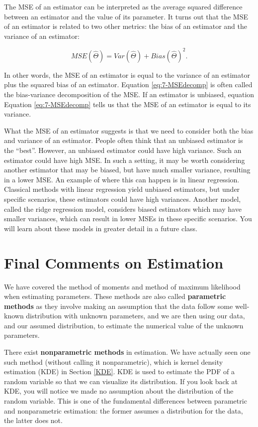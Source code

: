 \documentclass[
]{book}
\begin{document}
The MSE of an estimator can be interpreted as the average squared difference between an estimator and the value of its parameter. It turns out that the MSE of an estimator is related to two other metrics: the bias of an estimator and the variance of an estimator:

\begin{equation} 
MSE(\hat{\Theta}) = Var(\hat{\Theta}) + Bias(\hat{\Theta})^2.
\label{eq:7-MSEdecomp}
\end{equation}

In other words, the MSE of an estimator is equal to the variance of an estimator plus the squared bias of an estimator. Equation \eqref{eq:7-MSEdecomp} is often called the bias-variance decomposition of the MSE. If an estimator is unbiased, equation Equation \eqref{eq:7-MSEdecomp} tells us that the MSE of an estimator is equal to its variance.

What the MSE of an estimator suggests is that we need to consider both the bias and variance of an estimator. People often think that an unbiased estimator is the ``best''. However, an unbiased estimator could have high variance. Such an estimator could have high MSE. In such a setting, it may be worth considering another estimator that may be biased, but have much smaller variance, resulting in a lower MSE. An example of where this can happen is in linear regression. Classical methods with linear regression yield unbiased estimators, but under specific scenarios, these estimators could have high variances. Another model, called the ridge regression model, considers biased estimators which may have smaller variances, which can result in lower MSEs in these specific scenarios. You will learn about these models in greater detail in a future class.

\section{Final Comments on Estimation}\label{final-comments-on-estimation}

We have covered the method of moments and method of maximum likelihood when estimating parameters. These methods are also called \textbf{parametric methods} as they involve making an assumption that the data follow some well-known distribution with unknown parameters, and we are then using our data, and our assumed distribution, to estimate the numerical value of the unknown parameters.

There exist \textbf{nonparametric methods} in estimation. We have actually seen one such method (without calling it nonparametric), which is kernel density estimation (KDE) in Section \ref{KDE}. KDE is used to estimate the PDF of a random variable so that we can visualize its distribution. If you look back at KDE, you will notice we made no assumption about the distribution of the random variable. This is one of the fundamental differences between parametric and nonparametric estimation: the former assumes a distribution for the data, the latter does not.
\end{document}
